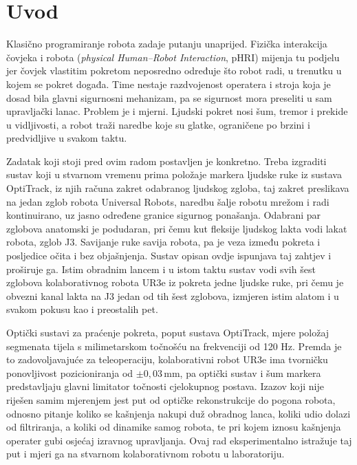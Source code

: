 \section{Uvod}

Klasično programiranje robota zadaje putanju unaprijed. Fizička interakcija
čovjeka i robota (\emph{physical Human--Robot Interaction}, pHRI) mijenja tu
podjelu jer čovjek vlastitim pokretom neposredno određuje što robot radi, u
trenutku u kojem se pokret događa. Time nestaje razdvojenost operatera i stroja
koja je dosad bila glavni sigurnosni mehanizam, pa se sigurnost mora preseliti u
sam upravljački lanac. Problem je i mjerni. Ljudski pokret nosi šum, tremor i
prekide u vidljivosti, a robot traži naredbe koje su glatke, ograničene po
brzini i predvidljive u svakom taktu.

Zadatak koji stoji pred ovim radom postavljen je konkretno. Treba izgraditi
sustav koji u stvarnom vremenu prima položaje markera ljudske ruke iz sustava
OptiTrack, iz njih računa zakret odabranog ljudskog zgloba, taj zakret
preslikava na jedan zglob robota Universal Robots, naredbu šalje robotu mrežom i
radi kontinuirano, uz jasno određene granice sigurnog ponašanja. Odabrani par
zglobova anatomski je podudaran, pri čemu kut fleksije ljudskog lakta vodi lakat robota,
zglob J3. Savijanje ruke savija robota, pa je veza između pokreta i posljedice
očita i bez objašnjenja. Sustav opisan ovdje ispunjava taj zahtjev i proširuje
ga. Istim obradnim lancem i u istom taktu sustav vodi svih šest zglobova kolaborativnog
robota UR3e iz pokreta jedne ljudske ruke, pri čemu je obvezni kanal lakta na J3
jedan od tih šest zglobova, izmjeren istim alatom i u svakom pokusu kao i preostalih pet.

Optički sustavi za praćenje pokreta, poput sustava OptiTrack, mjere položaj
segmenata tijela s milimetarskom točnošću na frekvenciji od 120 Hz. Premda je to
zadovoljavajuće za teleoperaciju, kolaborativni robot UR3e ima tvorničku ponovljivost
pozicioniranja od $\pm 0{,}03$\,mm, pa optički sustav i šum markera predstavljaju
glavni limitator točnosti cjelokupnog postava. Izazov koji nije riješen samim
mjerenjem jest put od optičke rekonstrukcije do pogona robota, odnosno pitanje koliko se kašnjenja
nakupi duž obradnog lanca, koliki udio dolazi od filtriranja, a koliki od dinamike
samog robota, te pri kojem iznosu kašnjenja operater gubi osjećaj izravnog upravljanja.
Ovaj rad eksperimentalno istražuje taj put i mjeri ga na stvarnom kolaborativnom
robotu u laboratoriju.

